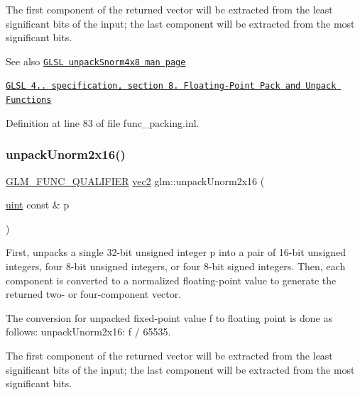 The first component of the returned vector will be extracted from the least significant bits of the input; the last component will be extracted from the most significant bits.

\begin{DoxySeeAlso}{See also}
\href{http://www.opengl.org/sdk/docs/manglsl/xhtml/unpackSnorm4x8.xml}{\tt G\+L\+SL unpack\+Snorm4x8 man page} 

\href{http://www.opengl.org/registry/doc/GLSLangSpec.4.20.8.pdf}{\tt G\+L\+SL 4.. specification, section 8. Floating-\/\+Point Pack and Unpack Functions} 
\end{DoxySeeAlso}


Definition at line 83 of file func\+\_\+packing.\+inl.

\mbox{\label{group__core__func__packing_gaff327a2fca8abfe31b74b914b68ac5ec}} 
\subsubsection{\texorpdfstring{unpack\+Unorm2x16()}{unpackUnorm2x16()}}
{\footnotesize\ttfamily \hyperlink{setup_8hpp_a33fdea6f91c5f834105f7415e2a64407}{G\+L\+M\+\_\+\+F\+U\+N\+C\+\_\+\+Q\+U\+A\+L\+I\+F\+I\+ER} \hyperlink{group__core__types_gaa1618f51db67eaa145db101d8c8431d8}{vec2} glm\+::unpack\+Unorm2x16 (\begin{DoxyParamCaption}\item[{\hyperlink{group__core__precision_ga4fd29415871152bfb5abd588334147c8}{uint} const \&}]{p }\end{DoxyParamCaption})}

First, unpacks a single 32-\/bit unsigned integer p into a pair of 16-\/bit unsigned integers, four 8-\/bit unsigned integers, or four 8-\/bit signed integers. Then, each component is converted to a normalized floating-\/point value to generate the returned two-\/ or four-\/component vector.

The conversion for unpacked fixed-\/point value f to floating point is done as follows\+: unpack\+Unorm2x16\+: f / 65535.

The first component of the returned vector will be extracted from the least significant bits of the input; the last component will be extracted from the most significant bits.

